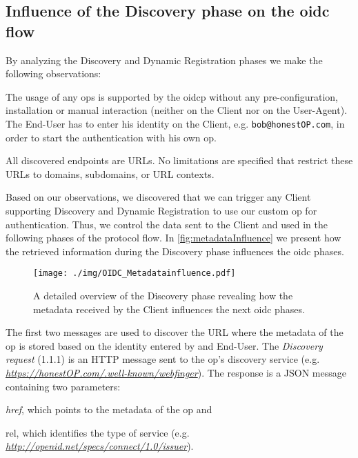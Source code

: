 \documentclass[conference,compsoc]{IEEEtran}
\renewenvironment{itemize}{\begin{compactitem}}{\end{compactitem}}
\begin{document}
\subsection{Influence of the Discovery phase on the \gls{oidc} flow}

By analyzing the Discovery and Dynamic Registration phases we make the following observations:

\begin{itemize}
    \item The usage of any \glspl{op} is supported by the \gls{oidcp} without any pre-configuration, installation or manual interaction (neither on the Client nor on the  User-Agent).
    The End-User has to enter his identity on the Client, e.g. \texttt{bob@honestOP.com}, in order to start the authentication with his own \gls{op}.

    \item All discovered endpoints are URLs.
    No limitations are specified that restrict these URLs to domains, subdomains, or URL contexts.
\end{itemize}

Based on our observations, we discovered that we can trigger any Client supporting Discovery and Dynamic Registration to use our custom \gls{op} for authentication.
Thus, we control the data sent to the Client and used in the following phases of the protocol flow. In \autoref{fig:metadataInfluence} we present how the retrieved information during the Discovery phase influences the \gls{oidc} phases.
\begin{figure}[!ht]
 \centering
 \texttt{[image: ./img/OIDC\_Metadatainfluence.pdf]}
\caption{A detailed overview of the Discovery phase revealing how the metadata received by the Client influences the next \gls{oidc} phases.}
 \label{fig:metadataInfluence}
\end{figure}

The first two messages are used to discover the URL where the metadata of the \gls{op} is stored based on the identity entered by and End-User. The \emph{Discovery request} (1.1.1) is an HTTP message sent to the \gls{op}'s discovery service (e.g.\emph{ \url{https://honestOP.com/.well-known/webfinger}}). The response is a JSON message containing two parameters: 
\begin{inparaenum}
	\item \emph{href}, which points to the metadata of the \gls{op} and 
	\item \gls{rel}, which identifies the type of service (e.g. \emph{\url{http://openid.net/specs/connect/1.0/issuer}}).
\end{inparaenum}
\end{document}
